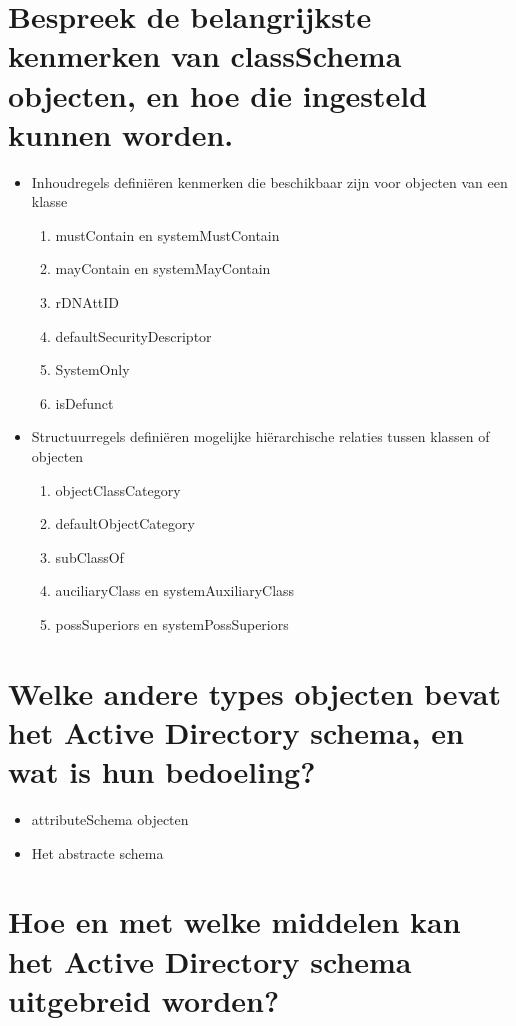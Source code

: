\section{Bespreek de belangrijkste kenmerken van classSchema objecten, en hoe
die ingesteld kunnen worden.}

\begin{itemize}
	\item Inhoudregels definiëren kenmerken die beschikbaar zijn voor
		objecten van een klasse
		\begin{enumerate}
			\item mustContain en systemMustContain
			\item mayContain en systemMayContain
			\item rDNAttID
			\item defaultSecurityDescriptor
			\item SystemOnly
			\item isDefunct
		\end{enumerate}

	\item Structuurregels definiëren mogelijke hiërarchische relaties tussen
		klassen of objecten

		\begin{enumerate}
			\item objectClassCategory
			\item defaultObjectCategory
			\item subClassOf
			\item auciliaryClass en systemAuxiliaryClass
			\item possSuperiors en systemPossSuperiors
		\end{enumerate}
\end{itemize}

\section{Welke andere types objecten bevat het Active Directory schema, en wat
is hun bedoeling?}

\begin{itemize}
	\item attributeSchema objecten
	\item Het abstracte schema
\end{itemize}

\section{Hoe en met welke middelen kan het Active Directory schema uitgebreid
worden?}

